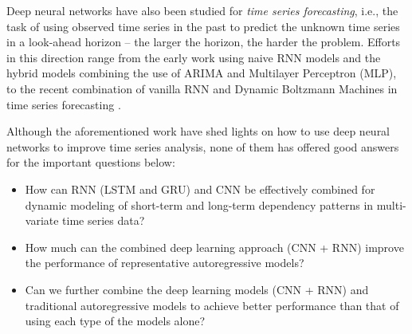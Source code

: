 Deep neural networks have also been studied for \textit{time series forecasting}, i.e., the task of using observed time series in the past to predict the unknown time series in a look-ahead horizon -- the larger the horizon, the harder the problem. Efforts in this direction range from the early work using naive RNN models \cite{connor1991recurrent} and the hybrid models \cite{zhang1998forecasting,zhang2003time,jain2007hybrid} combining the use of ARIMA \cite{box1970distribution} and Multilayer Perceptron (MLP), to the recent combination of vanilla RNN and Dynamic Boltzmann Machines in time series forecasting \cite{dasgupta2016nonlinear}.

Although the aforementioned work have shed lights on how to use deep neural networks to improve time series analysis, none of them has offered good answers for the important questions below:
\begin{itemize}
 \item How can RNN (LSTM and GRU) and CNN be effectively combined for dynamic modeling of short-term and long-term dependency patterns in multi-variate time series data?
 \item How much can the combined deep learning approach (CNN + RNN) improve the performance of representative autoregressive models? 
 \item Can we further combine the deep learning models (CNN + RNN) and traditional autoregressive models to achieve better performance than that of using each type of the models alone?
\end{itemize}  


